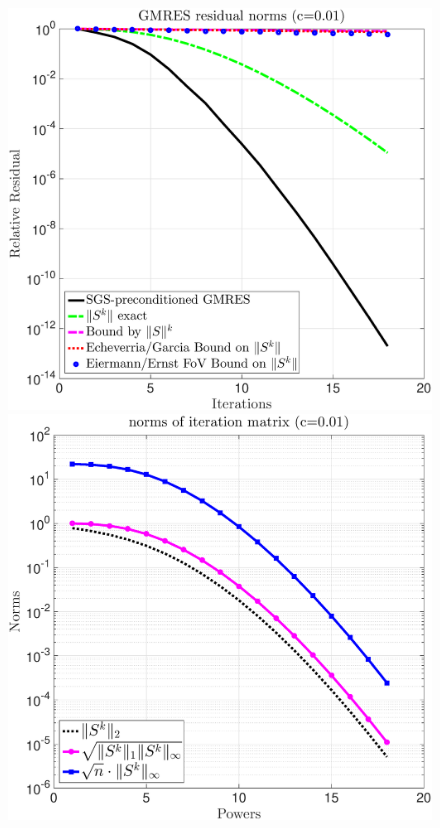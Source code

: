 \begin{figure}[h!]
\centering
\includegraphics[scale=0.20]{figures/Bounds_1e_neg2_500}
\includegraphics[scale=0.20]{figures/norm_1e_neg2_500_prec}\\

\end{figure}
